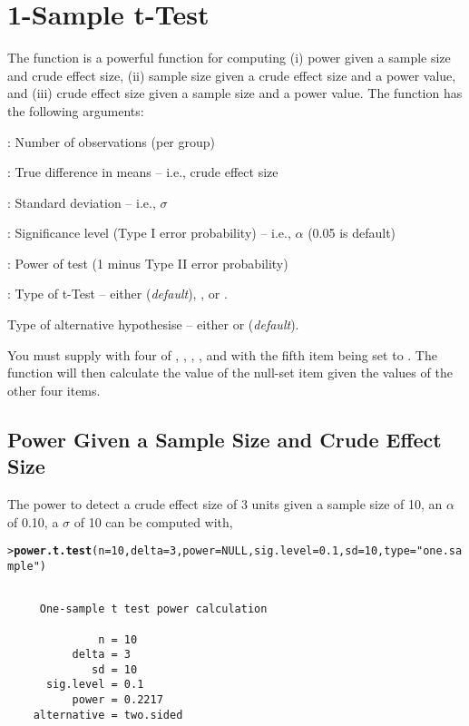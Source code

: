 \documentclass{article}\usepackage{graphicx, color}
\makeatletter
\newcommand{\hlfunctioncall}[1]{\textcolor[rgb]{0.501960784313725,0,0.329411764705882}{\textbf{#1}}}%
\newcommand{\hlstring}[1]{\textcolor[rgb]{0.6,0.6,1}{#1}}%
\newenvironment{kframe}{%
 \def\at@end@of@kframe{}%
 \ifinner\ifhmode%
  \def\at@end@of@kframe{\end{minipage}}%
  \begin{minipage}{\columnwidth}%
 \fi\fi%
 \def\FrameCommand##1{\hskip\@totalleftmargin \hskip-\fboxsep
 \colorbox{shadecolor}{##1}\hskip-\fboxsep
     \hskip-\linewidth \hskip-\@totalleftmargin \hskip\columnwidth}%
 \MakeFramed {\advance\hsize-\width
   \@totalleftmargin\z@ \linewidth\hsize
   \@setminipage}}%
 {\par\unskip\endMakeFramed%
 \at@end@of@kframe}
\newenvironment{knitrout}{}{} %
\makeatother
\begin{document}
\section{1-Sample t-Test}
The  function is a powerful function for computing (i) power given a sample size and crude effect size, (ii) sample size given a crude effect size and a power value, and (iii) crude effect size given a sample size and a power value.  The  function has the following arguments:

\begin{Itemize}
  \item {}: Number of observations (per group)
  \item {}: True difference in means -- i.e., crude effect size
  \item {}: Standard deviation -- i.e., $\sigma$
  \item {}: Significance level (Type I error probability) -- i.e., $\alpha$ (0.05 is default)
  \item {}: Power of test (1 minus Type II error probability) 
  \item {}: Type of t-Test -- either  (\emph{default}), , or .
  \item {} Type of alternative hypothesise -- either  or  (\emph{default}).
\end{Itemize}

You must supply  with four of , , , , and  with the fifth item being set to .  The function will then calculate the value of the null-set item given the values of the other four items.

\subsection{Power Given a Sample Size and Crude Effect Size}
The power to detect a crude effect size of 3 units given a sample size of 10, an $\alpha$ of 0.10, a $\sigma$ of 10 can be computed with,
\begin{knitrout}
\color{fgcolor}\begin{kframe}
\begin{alltt}
> \hlfunctioncall{power.t.test}(n=10,delta=3,power=NULL,sig.level=0.1,sd=10,type=\hlstring{"one.sample"})
\end{alltt}
\begin{verbatim}

     One-sample t test power calculation 

              n = 10
          delta = 3
             sd = 10
      sig.level = 0.1
          power = 0.2217
    alternative = two.sided
\end{verbatim}
\end{kframe}
\end{knitrout}
\end{document}

